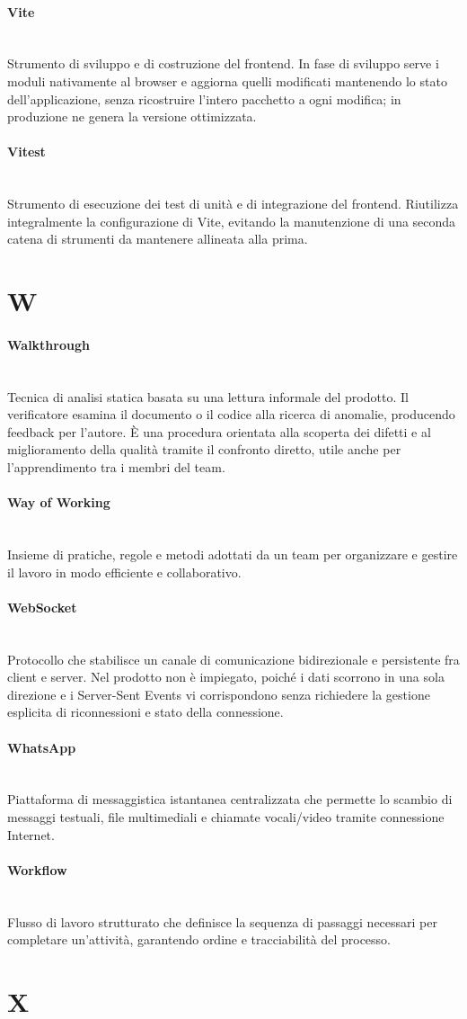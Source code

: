 \documentclass[a4paper, 10pt, colorlinks=true, linkcolor=black, urlcolor=blue, citecolor=blue, hidelinks]{article}
\newcommand{\glossaryterm}[2]{
    \paragraph{#1 \label{term:#1}} \mbox{} \\
    #2
    \vspace{0.5em}
}
\begin{document}
\glossaryterm{Vite}{Strumento di sviluppo e di costruzione del frontend. In fase di sviluppo serve i moduli nativamente al browser e aggiorna quelli modificati mantenendo lo stato dell'applicazione, senza ricostruire l'intero pacchetto a ogni modifica; in produzione ne genera la versione ottimizzata.}

\glossaryterm{Vitest}{Strumento di esecuzione dei test di unità e di integrazione del frontend. Riutilizza integralmente la configurazione di Vite, evitando la manutenzione di una seconda catena di strumenti da mantenere allineata alla prima.}

\newpage

\section*{W}

\glossaryterm{Walkthrough}{Tecnica di analisi statica basata su una lettura informale del prodotto. Il verificatore esamina il documento o il codice alla ricerca di anomalie, producendo feedback per l'autore. È una procedura orientata alla scoperta dei difetti e al miglioramento della qualità tramite il confronto diretto, utile anche per l'apprendimento tra i membri del team.}

\glossaryterm{Way of Working}{Insieme di pratiche, regole e metodi adottati da un team per organizzare e gestire il lavoro in modo efficiente e collaborativo.}

\glossaryterm{WebSocket}{Protocollo che stabilisce un canale di comunicazione bidirezionale e persistente fra client e server. Nel prodotto non è impiegato, poiché i dati scorrono in una sola direzione e i Server-Sent Events vi corrispondono senza richiedere la gestione esplicita di riconnessioni e stato della connessione.}

\glossaryterm{WhatsApp}{Piattaforma di messaggistica istantanea centralizzata che permette lo scambio di messaggi testuali, file multimediali e chiamate vocali/video tramite connessione Internet.}

\glossaryterm{Workflow}{Flusso di lavoro strutturato che definisce la sequenza di passaggi necessari per completare un'attività, garantendo ordine e tracciabilità del processo.}

\newpage

\section*{X}
\end{document}

